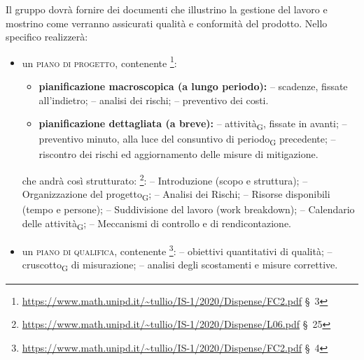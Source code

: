 
        \label{pianificazione}
            Il gruppo dovrà fornire dei documenti che illustrino la gestione del lavoro e mostrino come verranno assicurati qualità e conformità del prodotto. Nello specifico realizzerà:
            \begin{itemize}
                \item un \textsc{piano di progetto}, contenente \footnote{\url{https://www.math.unipd.it/~tullio/IS-1/2020/Dispense/FC2.pdf} \S\ 3}:
                    \begin{itemize}
                        \item \textbf{pianificazione macroscopica (a lungo periodo):}
                            \subitem -- scadenze, fissate all'indietro;
                            \subitem -- analisi dei rischi;
                            \subitem -- preventivo dei costi.
                        \item \textbf{pianificazione dettagliata (a breve):}
                            \subitem -- attività\textsubscript{G}, fissate in avanti;
                            \subitem -- preventivo minuto, alla luce del consuntivo di periodo\textsubscript{G} precedente;
                            \subitem -- riscontro dei rischi ed aggiornamento delle misure di mitigazione.
                    \end{itemize}

                    che andrà così strutturato: \footnote{\url{https://www.math.unipd.it/~tullio/IS-1/2020/Dispense/L06.pdf} \S\ 25}:
                    \subitem -- Introduzione (scopo e struttura);
                    \subitem -- Organizzazione del progetto\textsubscript{G};
                    \subitem -- Analisi dei Rischi;
                    \subitem -- Risorse disponibili (tempo e persone);
                    \subitem -- Suddivisione del lavoro (work breakdown);
                    \subitem -- Calendario delle attività\textsubscript{G};
                    \subitem -- Meccanismi di controllo e di rendicontazione.

                \item un \textsc{piano di qualifica}, contenente \footnote{\url{https://www.math.unipd.it/~tullio/IS-1/2020/Dispense/FC2.pdf} \S\ 4}:
                    \subitem -- obiettivi quantitativi di qualità;
                    \subitem -- cruscotto\textsubscript{G} di misurazione;
                    \subitem -- analisi degli scostamenti e misure correttive.
            \end{itemize}

